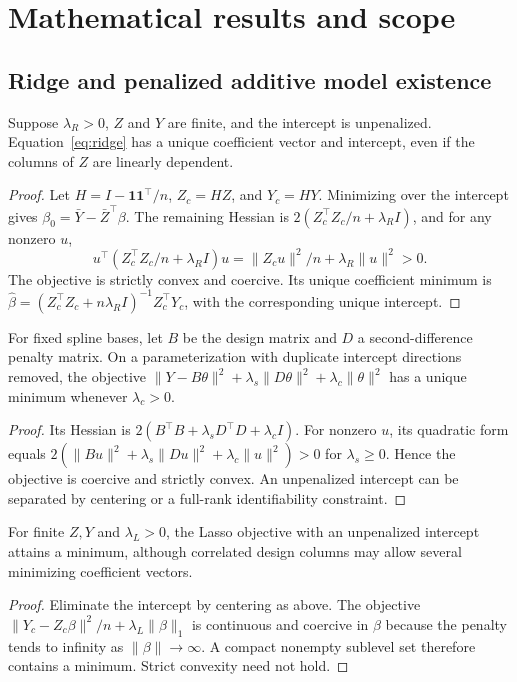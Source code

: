 \appendix
\section{Mathematical results and scope}\label{sec:proofs}
\subsection{Ridge and penalized additive model existence}
\begin{theorem}
Suppose $\lambda_R>0$, $Z$ and $Y$ are finite, and the intercept is unpenalized. Equation~\eqref{eq:ridge} has a unique coefficient vector and intercept, even if the columns of $Z$ are linearly dependent.
\end{theorem}
\begin{proof}
Let $H=I-\mathbf1\mathbf1^\top/n$, $Z_c=HZ$, and $Y_c=HY$. Minimizing over the intercept gives $\beta_0=\bar Y-\bar Z^\top\beta$. The remaining Hessian is $2(Z_c^\top Z_c/n+\lambda_R I)$, and for any nonzero $u$,
\[
u^\top(Z_c^\top Z_c/n+\lambda_R I)u
=\|Z_cu\|^2/n+\lambda_R\|u\|^2>0.
\]
The objective is strictly convex and coercive. Its unique coefficient minimum is
$\widehat\beta=(Z_c^\top Z_c+n\lambda_R I)^{-1}Z_c^\top Y_c$, with the corresponding unique intercept.
\end{proof}

\begin{proposition}
For fixed spline bases, let $B$ be the design matrix and $D$ a second-difference penalty matrix. On a parameterization with duplicate intercept directions removed, the objective $\|Y-B\theta\|^2+\lambda_s\|D\theta\|^2+\lambda_c\|\theta\|^2$ has a unique minimum whenever $\lambda_c>0$.
\end{proposition}
\begin{proof}
Its Hessian is $2(B^\top B+\lambda_sD^\top D+\lambda_c I)$. For nonzero $u$, its quadratic form equals $2(\|Bu\|^2+\lambda_s\|Du\|^2+\lambda_c\|u\|^2)>0$ for $\lambda_s\geq0$. Hence the objective is coercive and strictly convex. An unpenalized intercept can be separated by centering or a full-rank identifiability constraint.
\end{proof}

\begin{proposition}
For finite $Z,Y$ and $\lambda_L>0$, the Lasso objective with an unpenalized intercept attains a minimum, although correlated design columns may allow several minimizing coefficient vectors.
\end{proposition}
\begin{proof}
Eliminate the intercept by centering as above. The objective $\|Y_c-Z_c\beta\|^2/n+\lambda_L\|\beta\|_1$ is continuous and coercive in $\beta$ because the penalty tends to infinity as $\|\beta\|\to\infty$. A compact nonempty sublevel set therefore contains a minimum. Strict convexity need not hold.
\end{proof}

